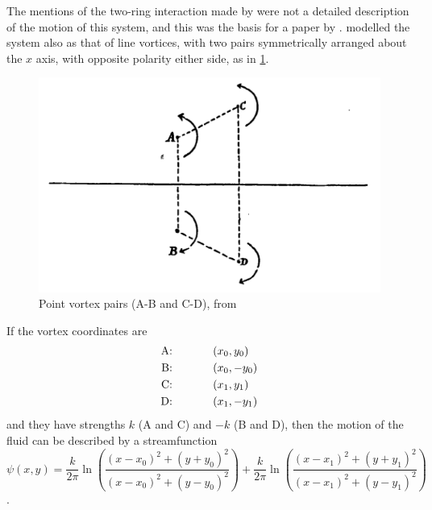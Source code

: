 \documentclass[10pt, a4paper]{article}
\numberwithin{equation}{section}
\begin{document}
The mentions of the two-ring interaction made by \citeauthor{helmholtz67} were not a detailed description of the motion of this system, and this was the basis for a paper by \citet{love94}.
\citeauthor{love94} modelled the system also as that of line vortices, with two pairs symmetrically arranged about the $x$ axis, with opposite polarity either side, as in \cref{fig:lovevort}.
\begin{figure}[ht]
\includegraphics[width=\textwidth]{lovevort}
\caption{Point vortex pairs (A-B and C-D), from \citet[p.186]{love94}}
\label{fig:lovevort}
\end{figure}
If the vortex coordinates are
\begin{align}
\mbox{A:}&\hspace{0.5in}(x_0,y_0)\\
\mbox{B:}&\hspace{0.5in}(x_0,-y_0)\\
\mbox{C:}&\hspace{0.5in}(x_1,y_1)\\
\mbox{D:}&\hspace{0.5in}(x_1,-y_1)
\end{align}
and they have strengths $k$ (A and C) and $-k$ (B and D), then the motion of the fluid can be described by a streamfunction
\begin{equation}
\psi(x,y)=\frac{k}{2\pi}\ln\left(\frac{(x-x_0)^2 + (y+y_0)^2}{(x-x_0)^2 + (y-y_0)^2}\right) + \frac{k}{2\pi}\ln\left(\frac{(x-x_1)^2 + (y+y_1)^2}{(x-x_1)^2 + (y-y_1)^2}\right)
\label{eq:lovesf}
\end{equation}
\citep{love94}.
\end{document}

